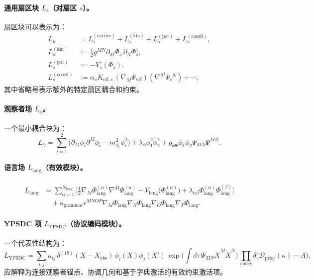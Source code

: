 \documentclass[11pt,a4paper]{article}
\begin{document}
	\paragraph{通用扇区块 $L_s$（对扇区 $s$）。}
	扇区块可以表示为：
	\begin{align}
		L_s &= L^{(\mathrm{carrier})}_s + L^{(\mathrm{kin})}_s + L^{(\mathrm{pot})}_s + L^{(\mathrm{coord})}_s, \\
		L^{(\mathrm{kin})}_s &:= \frac{1}{2}g^{MN}\partial_M\Phi_s\,\partial_N\Phi_s^\dagger, \\
		L^{(\mathrm{pot})}_s &:= -V_s(\Phi_s), \\
		L^{(\mathrm{coord})}_s &:= \alpha_s K_{\mathrm{eff},s}\,(\nabla_M\Psi_{sN})(\nabla^M\Psi_{s}{}^{N}) + \cdots,
	\end{align}
	其中省略号表示额外的特定扇区耦合和约束。
	
	\paragraph{观察者场 $L_{\phi}$。}
	一个最小耦合块为：
	\begin{equation}
		L_{\phi}=\sum_{i=1}^{2}\Big(\partial_M\phi_i\partial^M\phi_i - m_{\phi_i}^2\phi_i^2\Big) + \lambda_{\phi}\phi_1^2\phi_2^2 + g_{\phi\Psi}\phi_1\phi_2\Psi_{MN}\Psi^{MN}.
	\end{equation}
	
	\paragraph{语言场 $L_{\mathrm{lang}}$（有效模块）。}
	\begin{align}
		L_{\mathrm{lang}} &= \sum_{\alpha=1}^{N_{\mathrm{lang}}}\Big[
		\frac{1}{2}\nabla_M\Phi_{\mathrm{lang}}^{(\alpha)}\nabla^M\Phi_{\mathrm{lang}}^{(\alpha)}
		- V_{\mathrm{lang}}\big(\Phi_{\mathrm{lang}}^{(\alpha)}\big)
		+ \lambda_{\alpha\beta}\Phi_{\mathrm{lang}}^{(\alpha)}\Phi_{\mathrm{lang}}^{(\beta)}
		\Big] \nonumber\\
		&\quad + \kappa_{\mathrm{grammar}}\epsilon^{MNOP}\nabla_M\Phi_{\mathrm{lang}}\nabla_N\Phi_{\mathrm{lang}}\nabla_O\Phi_{\mathrm{lang}}\nabla_P\Phi_{\mathrm{lang}}.
	\end{align}
	
	\paragraph{YPSDC 项 $L_{\mathrm{YPSDC}}$（协议编码模块）。}
	一个代表性结构为：
	\begin{equation}
		L_{\mathrm{YPSDC}} = \sum_{i,j}\kappa_{ij}\,\delta^{(19)}(X-X_{\mathrm{obs}})\,\phi_i(X)\phi_j(X')\,
		\exp\!\Big(\int d\tau\,\Psi_{MN}\dot X^M\dot X^N\Big)\,
		\prod_{\mathrm{codes}}\delta\big(\mathcal{D}_{\mathrm{prior}}(\kappa)-A\big),
	\end{equation}
	应解释为连接观察者锚点、协调几何和基于字典激活的有效约束激活项。
	
\end{document}

